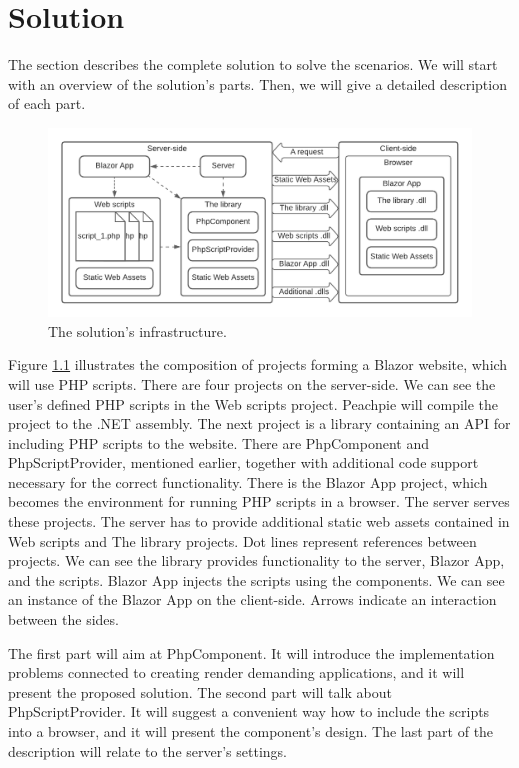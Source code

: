 \chapter{Solution}

The section describes the complete solution to solve the scenarios.
We will start with an overview of the solution's parts.
Then, we will give a detailed description of each part.
\par
\begin{figure}[H]\centering
\includegraphics[scale=0.7]{./img/SolutionInfrastructure}
\caption{The solution's infrastructure.}
\label{img03:infrastructure}
\end{figure} 
\par
Figure \ref{img03:infrastructure} illustrates the composition of projects forming a Blazor website, which will use PHP scripts.
There are four projects on the server-side.
We can see the user's defined PHP scripts in the Web scripts project.
Peachpie will compile the project to the .NET assembly.
The next project is a library containing an API for including PHP scripts to the website.
There are PhpComponent and PhpScriptProvider, mentioned earlier, together with additional code support necessary for the correct functionality.
There is the Blazor App project, which becomes the environment for running PHP scripts in a browser.
The server serves these projects.
The server has to provide additional static web assets contained in Web scripts and The library projects.
Dot lines represent references between projects.
We can see the library provides functionality to the server, Blazor App, and the scripts.
Blazor App injects the scripts using the components.
We can see an instance of the Blazor App on the client-side.
Arrows indicate an interaction between the sides. 
\par
The first part will aim at PhpComponent.
It will introduce the implementation problems connected to creating render demanding applications, and it will present the proposed solution.
The second part will talk about PhpScriptProvider.
It will suggest a convenient way how to include the scripts into a browser, and it will present the component's design.
The last part of the description will relate to the server's settings.


